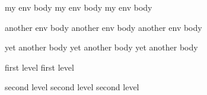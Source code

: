 \begin{myenv}
  my env body
  my env body
  my env body
\end{myenv}

\begin{anotherenv}
  another env body
  another env body
  another env body
\end{anotherenv}
\begin{yetanother}
  yet another body
  yet another body
  yet another body
\end{yetanother}

\begin{level1}
  first level
  first level
  \begin{level2}
   second level 
   second level 
   second level 
  \end{level2}
\end{level1}
